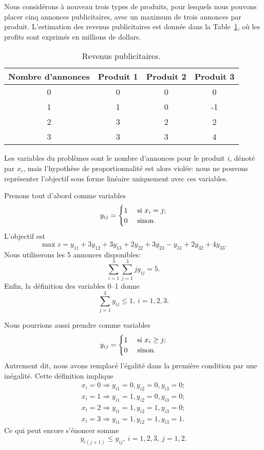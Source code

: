 \begin{example}
Nous considérons à nouveau trois types de produits, pour lesquels nous pouvons placer cinq annonces publicitaires, avec un maximum de trois annonces par produit.
L'estimation des revenus publicitaires est donnée dans la Table~\ref{tab:ads}, où les profits sont exprimés en millions de dollars.
\begin{table}[htb]
\begin{center}
\begin{tabular}{|c|c|c|c|}
\hline
Nombre d'annonces & Produit 1 & Produit 2 & Produit 3 \\
\hline
0 & 0 & 0 & 0 \\
\hline
1 & 1 & 0 & -1 \\
\hline
2 & 3 & 2 & 2 \\
\hline
3 & 3 & 3 & 4 \\
\hline
\end{tabular}
\caption{Revenus publicitaires.}
\label{tab:ads}
\end{center}
\end{table}
Les variables du problèmes sont le nombre d'annonces pour le produit $i$, dénoté par $x_i$, mais l'hypothèse de proportionnalité est alors violée: nous ne pouvons représenter l'objectif sous forme linéaire uniquement avec ces variables.

Prenons tout d'abord comme variables
\[
y_{ij} =
\begin{cases}
1 & \mbox{ si } x_i = j;\\
0 & \mbox{ sinon}.
\end{cases}
\]
L'objectif est
\[
\max z = y_{11} + 3y_{12} + 3y_{13} + 2y_{22} + 3y_{23} - y_{31} + 2y_{32} + 4y_{33}.
\]
Nous utiliserons les 5 annonces disponibles:
\[
\sum_{i = 1}^3 \sum_{j = 1}^3 jy_{ij} = 5.
\]
Enfin, la définition des variables 0--1 donne
\[
\sum_{j = 1}^3 y_{ij} \leq 1,\ i = 1,2,3.
\]

Nous pourrions aussi prendre comme variables
\[
y_{ij} =
\begin{cases}
1 & \mbox{ si } x_i \geq j; \\
0 & \mbox{ sinon}.
\end{cases}
\]
Autrement dit, nous avons remplacé l'égalité dans la première condition par une inégalité.
Cette définition implique
\begin{align*}
x_i = 0 \Rightarrow y_{i1} = 0, y_{i2} = 0, y_{i3} = 0;\\
x_i = 1 \Rightarrow y_{i1} = 1, y_{i2} = 0, y_{i3} = 0;\\
x_i = 2 \Rightarrow y_{i1} = 1, y_{i2} = 1, y_{i3} = 0; \\
x_i = 3 \Rightarrow y_{i1} = 1, y_{i2} = 1, y_{i3} = 1.
\end{align*}
Ce qui peut encore s'énoncer somme
\[
y_{i(j+1)} \leq y_{ij},\ i = 1,2,3,\ j=1,2.
\]


\end{example}
